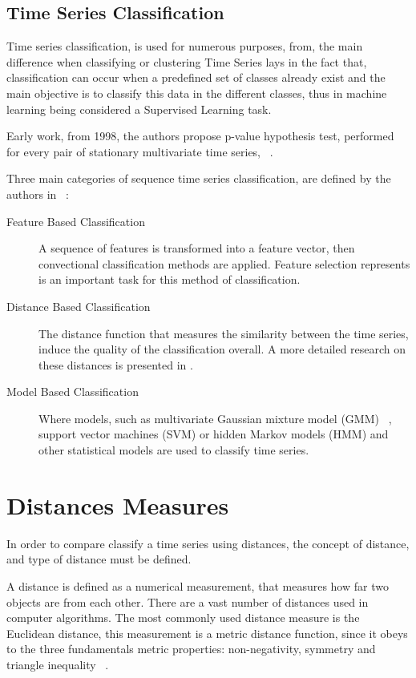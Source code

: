 

\subsection{Time Series Classification}
Time series classification, is used for numerous purposes, from, the main difference when classifying or clustering Time Series lays in the fact that, classification can occur when a predefined set of classes already exist and the main objective is to classify this data in the different classes, thus in machine learning being considered a Supervised Learning task. 

Early work, from 1998, the authors propose p-value hypothesis test, performed for every pair of stationary multivariate time series, ~\cite{MTS1999}.

Three main categories of sequence time series classification, are defined by the authors in ~\cite{MTS_Classification}:

\begin{description}
\item[Feature Based Classification] A sequence of features is transformed into a feature vector, then convectional classification methods are applied. Feature selection represents is an important task for this method of classification.

\item [Distance Based Classification] The distance function that measures the
similarity between the time series, induce the quality of the classification overall. A more detailed research on these distances is presented in \cite{Knorr2000}.

\item [Model Based Classification] Where models, such as multivariate Gaussian mixture model (GMM) ~\cite{Laxhammar2008}, support vector machines (SVM) or hidden Markov models (HMM) and other statistical models are used to classify time series.
\end{description}
 

\section{Distances Measures}
In order to compare classify a time series using distances, the concept of distance, and type of distance must be defined.

A distance is defined as a numerical measurement, that measures how far two objects are from each other. There are a vast number of distances used in computer algorithms. The most commonly used distance measure is the Euclidean distance, this measurement is a metric distance function, since it obeys to the three fundamentals metric properties: non-negativity, symmetry and triangle inequality ~\cite{Cai2004}. 

